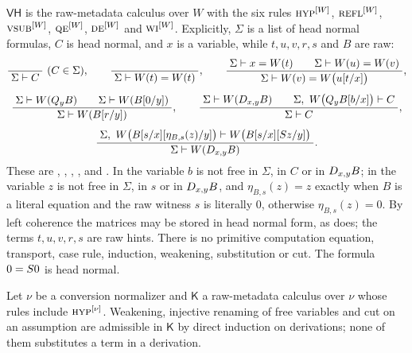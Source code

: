 \begin{definition}
\label{comp:def:vh}
$\mathsf{VH}$ is the raw-metadata calculus over $W$ with the six rules
$\rulename{Hyp}^{[W]}$, $\rulename{Refl}^{[W]}$, $\rulename{VSub}^{[W]}$,
$\rulename{QE}^{[W]}$, $\rulename{DE}^{[W]}$ and $\rulename{WI}^{[W]}$.
Explicitly, $\Sigma$ is a list of head normal formulas, $C$ is head normal,
and $x$ is a variable, while $t,u,v,r,s$ and $B$ are raw:
\begin{gather*}
 \infrule{}{\Sigma\proves C}\ (C\in\Sigma),
 \qquad
 \infrule{}{\Sigma\proves W(t)=W(t)},
 \qquad
 \infrule{\Sigma\proves x=W(t)\qquad\Sigma\proves W(u)=W(v)}
         {\Sigma\proves W(v)=W\bigl(u\subst{t}{x}\bigr)},
 \\[4pt]
 \infrule{\Sigma\proves W(\Q{y}B)\qquad\Sigma\proves W(B\subst{0}{y})}
         {\Sigma\proves W(B\subst{r}{y})},
 \qquad
 \infrule{\Sigma\proves W(\D{x}{y}B)\qquad
          \Sigma,\ W\bigl(\Q{y}B\subst{b}{x}\bigr)\proves C}
         {\Sigma\proves C},
 \\[4pt]
 \infrule{\Sigma,\ W\bigl(B\subst{s}{x}\subst{\eta_{B,s}(z)}{y}\bigr)\proves
          W\bigl(B\subst{s}{x}\subst{\Suc z}{y}\bigr)}
         {\Sigma\proves W(\D{x}{y}B)}.
\end{gather*}
These are , , , ,
 and . In  the variable $b$ is not
free in $\Sigma$, in $C$ or in $D_{x,y}B$; in  the variable $z$
is not free in $\Sigma$, in $s$ or in $D_{x,y}B$, and $\eta_{B,s}(z)=z$
exactly when $B$ is a literal equation and the raw witness $s$ is literally
$0$, otherwise $\eta_{B,s}(z)=0$. By left coherence the matrices may be
stored in head normal form, as  does; the terms
$t,u,v,r,s$ are raw hints. There is no primitive computation equation,
transport, case rule, induction, weakening, substitution or cut. The formula
$0=S0$ is head normal.
\end{definition}

\begin{lemma}
\label{comp:lem:rawstruct}
Let $\nu$ be a conversion normalizer and $\mathsf K$ a raw-metadata calculus
over $\nu$ whose rules include $\rulename{Hyp}^{[\nu]}$. Weakening, injective
renaming of free variables and cut on an assumption are admissible in
$\mathsf K$ by direct induction on derivations; none of them substitutes a
term in a derivation.
\end{lemma}


